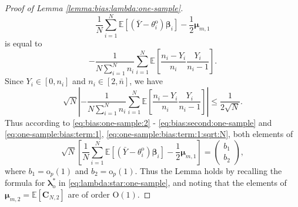 \documentclass[12pt,letterpaper]{article}
\begin{document}
\begin{proof}[Proof of Lemma \ref{lemma:bias:lambda:one-sample}]
$$\displaystyle\frac{1}{N}\sum_{i=1}^N\mathbb{E}\left[\left(\bar{Y}-\theta_i^{\mathrm{o}}\right)\boldsymbol{\beta}_i\right]-\frac{1}{2}\boldsymbol{\mu}_{m,1}$$ 
is equal to 
\begin{equation}\label{eq:one-sample:bias:term:1}
    -\frac{1}{N\sum_{i=1}^Nn_i}\sum_{i=1}^N\mathbb{E}\left[\frac{n_i-Y_i}{n_i}\frac{Y_i}{n_i-1}\right].
\end{equation}
Since $Y_i\in[0,n_i]$ and $n_i\in[2,\bar{n}]$, we have 
\begin{equation}\label{eq:one-sample:bias:term:1:sqrt:N}
    \sqrt{N}\left|-\frac{1}{N\sum_{i=1}^Nn_i}\sum_{i=1}^N\mathbb{E}\left[\frac{n_i-Y_i}{n_i}\frac{Y_i}{n_i-1}\right]\right|\leq\frac{1}{2\sqrt{N}}.
\end{equation}
Thus according to \eqref{eq:bias:one-sample:2} - \eqref{eq:bias:second:one-sample} and \eqref{eq:one-sample:bias:term:1}, \eqref{eq:one-sample:bias:term:1:sqrt:N}, both elements of  
$$\sqrt{N}\left[\frac{1}{N}\sum_{i=1}^N\mathbb{E}\left[\left(\bar{Y}-\theta_i^{\mathrm{o}}\right)\boldsymbol{\beta}_i\right]-\frac{1}{2}\boldsymbol{\mu}_{m,1}\right]=\begin{pmatrix}
    b_1\\
    b_2
\end{pmatrix},$$
where $b_1=\mathrm{o}_p(1)$ and $b_2=\mathrm{o}_p(1)$. Thus the Lemma holds by recalling the formula for $\boldsymbol{\lambda}_{\mathrm{o}}^*$ in \eqref{eq:lambda:star:one-sample}, and noting that the elements of $\boldsymbol{\mu}_{m,2}=\mathbb{E}[\mathbf{C}_{N,2}]$ are of order $\mathrm{O}(1)$. 
\end{proof}
\end{document}
